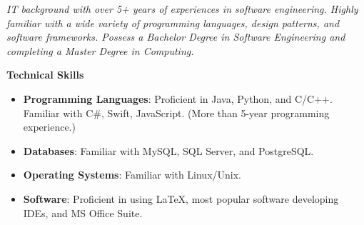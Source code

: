 \documentclass{res}
\newcommand{\resheading}[1]{{\normalsize \colorbox{mygrey}{\begin{minipage}{\textwidth}{\textbf{#1 \vphantom{p\^{E}}}}\end{minipage}}}}
\begin{document}
\begin{resume}
\begin{CJK*}{UTF8}{song}
\normalsize

\vspace*{-0.8cm}
\textit{IT background with over 5+ years of experiences in software engineering. Highly familiar with a wide variety of programming languages, design patterns, and software frameworks. Possess a Bachelor Degree in Software Engineering and completing a Master Degree in Computing.}

%



%

\resheading{Technical Skills}
\begin{itemize}
\itemsep -2pt %
  \item{\bf Programming Languages}: Proficient in Java, Python, and C/C++. Familiar with C\#, Swift, JavaScript. (More than 5-year programming experience.)
  \item{\bf Databases}: Familiar with MySQL, SQL Server, and PostgreSQL.
  \item{\bf Operating Systems}: Familiar with Linux/Unix.
  \item{\bf Software}: Proficient in using \LaTeX, most popular software developing IDEs, and MS Office Suite.
\end{itemize}




\end{CJK*}
\end{resume}
\end{document}
